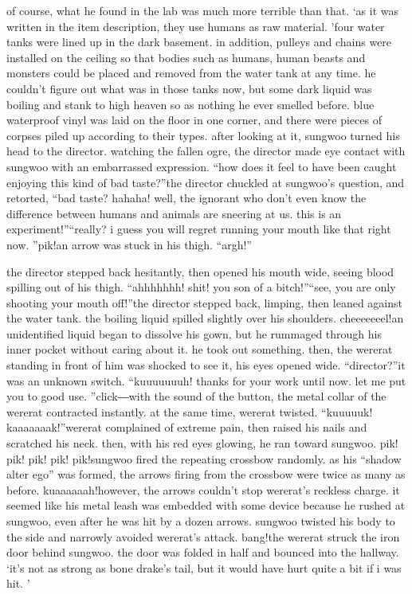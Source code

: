  of course, what he found in the lab was much more terrible than that.
‘as it was written in the item description, they use humans as raw material.
’four water tanks were lined up in the dark basement.
 in addition, pulleys and chains were installed on the ceiling so that bodies such as humans, human beasts and monsters could be placed and removed from the water tank at any time.
he couldn’t figure out what was in those tanks now, but some dark liquid was boiling and stank to high heaven so as nothing he ever smelled before.
blue waterproof vinyl was laid on the floor in one corner, and there were pieces of corpses piled up according to their types.
after looking at it, sungwoo turned his head to the director.
 watching the fallen ogre, the director made eye contact with sungwoo with an embarrassed expression.
“how does it feel to have been caught enjoying this kind of bad taste?”the director chuckled at sungwoo’s question, and retorted, “bad taste? hahaha! well, the ignorant who don’t even know the difference between humans and animals are sneering at us.
 this is an experiment!”“really? i guess you will regret running your mouth like that right now.
”pik!an arrow was stuck in his thigh.
“argh!”

the director stepped back hesitantly, then opened his mouth wide, seeing blood spilling out of his thigh.
“ahhhhhhh! shit! you son of a bitch!”“see, you are only shooting your mouth off!”the director stepped back, limping, then leaned against the water tank.
 the boiling liquid spilled slightly over his shoulders.
cheeeeeeel!an unidentified liquid began to dissolve his gown, but he rummaged through his inner pocket without caring about it.
 he took out something.
then, the wererat standing in front of him was shocked to see it, his eyes opened wide.
“director?”it was an unknown switch.
“kuuuuuuuh! thanks for your work until now.
 let me put you to good use.
”click―with the sound of the button, the metal collar of the wererat contracted instantly.
 at the same time, wererat twisted.
“kuuuuuk! kaaaaaaak!”wererat complained of extreme pain, then raised his nails and scratched his neck.
 then, with his red eyes glowing, he ran toward sungwoo.
pik! pik! pik! pik! pik!sungwoo fired the repeating crossbow randomly.
 as his “shadow alter ego” was formed, the arrows firing from the crossbow were twice as many as before.
kuaaaaaah!however, the arrows couldn’t stop wererat’s reckless charge.
 it seemed like his metal leash was embedded with some device because he rushed at sungwoo, even after he was hit by a dozen arrows.
sungwoo twisted his body to the side and narrowly avoided wererat’s attack.
bang!the wererat struck the iron door behind sungwoo.
 the door was folded in half and bounced into the hallway.
‘it’s not as strong as bone drake’s tail, but it would have hurt quite a bit if i was hit.
’

 
